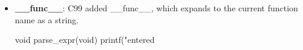 \documentclass{report}
\begin{document}
\begin{itemize}
\begin{cppcode}
                    b->len = 1024;
                    b->data[0] = 42;
                \end{cppcode}
                \bigbreak \noindent 
                The flexible array member must be the last member of the struct.
            \item \textbf{\_\_func\_\_}: C99 added \_\_func\_\_, which expands to the current function name as a string.
                \bigbreak \noindent 
                \begin{cppcode}
                    void parse_expr(void) {
                        printf("entered %
                    }
                \end{cppcode}
        \end{itemize}

        \pagebreak 
\end{document}

